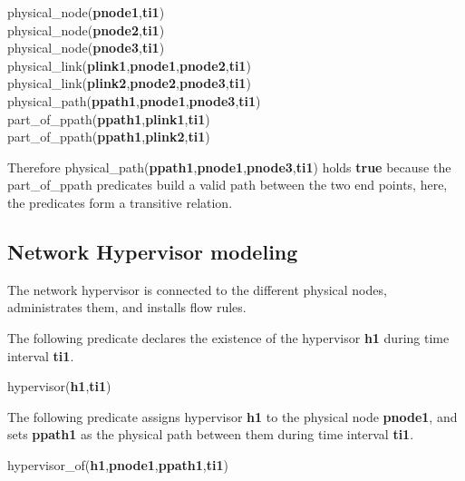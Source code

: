 \begin{myformula}
physical\_node(\textbf{pnode1},\textbf{ti1})\\
physical\_node(\textbf{pnode2},\textbf{ti1})\\
physical\_node(\textbf{pnode3},\textbf{ti1})\\
physical\_link(\textbf{plink1},\textbf{pnode1},\textbf{pnode2},\textbf{ti1})\\
physical\_link(\textbf{plink2},\textbf{pnode2},\textbf{pnode3},\textbf{ti1})\\
physical\_path(\textbf{ppath1},\textbf{pnode1},\textbf{pnode3},\textbf{ti1})\\
part\_of\_ppath(\textbf{ppath1},\textbf{plink1},\textbf{ti1})\\
part\_of\_ppath(\textbf{ppath1},\textbf{plink2},\textbf{ti1})
\end{myformula}

Therefore physical\_path(\textbf{ppath1},\textbf{pnode1},\textbf{pnode3},\textbf{ti1}) holds \textbf{true} because the part\_of\_ppath predicates build a valid path between the two end points, \eg here, the predicates form a transitive relation. 









\subsection{Network Hypervisor modeling}
The network hypervisor is connected to the different physical nodes, administrates them, and  installs flow rules.

The following predicate declares the existence of the hypervisor \textbf{h1} during time interval \textbf{ti1}.
\begin{myformula}
hypervisor(\textbf{h1},\textbf{ti1})
\end{myformula}


The following predicate assigns hypervisor \textbf{h1} to the physical node \textbf{pnode1}, and sets \textbf{ppath1} as the physical path between them during time interval \textbf{ti1}.
\begin{myformula}
hypervisor\_of(\textbf{h1},\textbf{pnode1},\textbf{ppath1},\textbf{ti1})
\end{myformula}

